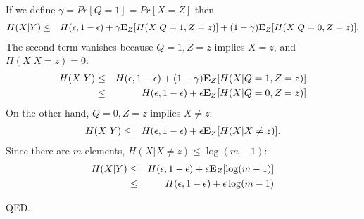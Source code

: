 \documentclass[11pt]{article} \usepackage{amssymb}
\newcommand{\E}{{\bf E}} \newcommand{\Cov}{{\bf Cov}}
\begin{document}
If we define $\gamma=Pr[Q=1]=Pr[X=Z]$ then
\begin{eqnarray*}
  H(X|Y) 
  &\leq& H(\epsilon,1-\epsilon) + \gamma\E_Z[H(X|Q=1,Z=z)] + (1-\gamma)\E_Z[H(X|Q=0,Z=z)].
\end{eqnarray*}
The second term vanishes because $Q=1,Z=z$ implies $X=z$, and $H(X|X=z)=0$:
\begin{eqnarray*}
  H(X|Y) 
  &\leq& H(\epsilon,1-\epsilon) + (1-\gamma)\E_Z[H(X|Q=1,Z=z)]\\
  &\leq& H(\epsilon,1-\epsilon) + \epsilon\E_Z[H(X|Q=0,Z=z)]
\end{eqnarray*}
On the other hand, $Q=0,Z=z$ implies $X\not=z$:
\begin{eqnarray*}
  H(X|Y) 
  &\leq& H(\epsilon,1-\epsilon) + \epsilon\E_Z[H(X|X\not=z)].
\end{eqnarray*}
Since there are $m$ elements, $H(X|X\not=z)\leq \log(m-1)$:
\begin{eqnarray*}
  H(X|Y) 
  &\leq& H(\epsilon,1-\epsilon) + \epsilon\E_Z[\log(m-1)]\\
  &\leq& H(\epsilon,1-\epsilon) + \epsilon\log(m-1)
\end{eqnarray*}

QED.
\end{document}
